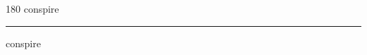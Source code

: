 
\begin{frame}
\begin{center}
\begin{turn}{180}
{\fontsize{2.5cm}{1em}\selectfont conspire}
\end{turn}
\vspace{1em}\par  
\hrule
\vspace{1em}\par  
{\fontsize{2.5cm}{1em}\selectfont conspire}
\end{center}
\end{frame}
